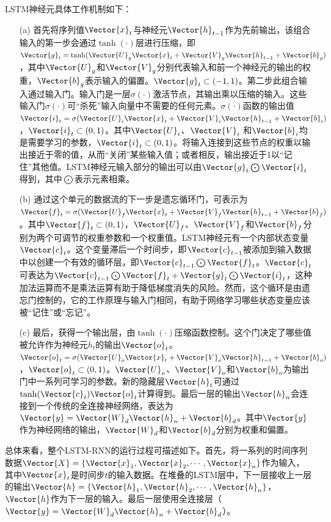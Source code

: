 LSTM神经元具体工作机制如下：
\begin{enumerate}
  \item[(a)] 首先将序列值$\Vector{x}_t$与神经元$\Vector{h}_{t-1}$作为先前输出，该组合输入的第一步会通过$\tanh(\cdot)$层进行压缩，即$\Vector{g}_t=\tanh(\Vector{U}_g \Vector{x}_t+\Vector{V}_g\Vector{h}_{t-1}+\Vector{b}_g)$，其中$\Vector{U}_g$和$\Vector{V}_g$分别代表输入和前一个神经元的输出的权重，$\Vector{b}_g$表示输入的偏置。$\Vector{g}_t\subset(-1,1)$。第二步此组合输入通过输入门。输入门是一层$\sigma(\cdot)$激活节点，其输出乘以压缩的输入。这些输入门$\sigma(\cdot)$可“杀死”输入向量中不需要的任何元素。$\sigma(\cdot)$函数的输出值$\Vector{i}_t=\sigma(\Vector{U}_i \Vector{x}_t+\Vector{V}_i\Vector{h}_{t-1}+\Vector{b}_i)$，$\Vector{i}_t\subset(0,1)$。其中$\Vector{U}_i$、$\Vector{V}_i$ 和$\Vector{b}_i$均是需要学习的参数，$\Vector{i}_t\subset(0,1)$。将输入连接到这些节点的权重以输出接近于零的值，从而“关闭”某些输入值；或者相反，输出接近于1以“记住”其他值。LSTM神经元输入部分的输出可以由$\Vector{g}_t\bigodot\Vector{i}_t$得到，其中$\bigodot$表示元素相乘。
  \item[(b)] 通过这个单元的数据流的下一步是遗忘循环门，可表示为$\Vector{f}_t=\sigma(\Vector{U}_f\Vector{x}_t+\Vector{V}_f\Vector{h}_{t-1}+\Vector{b}_f)$。其中$\Vector{f}_t\subset(0,1)$，$\Vector{U}_f$、$\Vector{V}_f$和$\Vector{b}_f$分别为两个可调节的权重参数和一个权重值。LSTM神经元有一个内部状态变量$\Vector{c}_t$。这个变量滞后一个时间步，即$\Vector{c}_{t-1}$被添加到输入数据中以创建一个有效的循环层，即$\Vector{c}_{t-1}\bigodot\Vector{f}_t$。$\Vector{c}_t$可表达为$\Vector{c}_{t-1}\bigodot\Vector{f}_t+\Vector{g}_t\bigodot\Vector{i}_t$，这种加法运算而不是乘法运算有助于降低梯度消失的风险。然而，这个循环是由遗忘门控制的，它的工作原理与输入门相同，有助于网络学习哪些状态变量应该被“记住”或“忘记”。
  \item[(c)] 最后，获得一个输出层，由$\tanh(\cdot)$压缩函数控制。这个门决定了哪些值被允许作为神经元$h_t$的输出$\Vector{o}_t$。$\Vector{o}_t=\sigma(\Vector{U}_o\Vector{x}_t+\Vector{V}_o\Vector{h}_{t-1}+\Vector{b}_o)$，$\Vector{o}_t\subset(0,1)$。$\Vector{U}_o$、$\Vector{V}_o$和$\Vector{b}_o$为输出门中一系列可学习的参数。新的隐藏层$\Vector{h}_t$可通过$\tanh(\Vector{c}_t)\Vector{o}_t$计算得到。最后一层的输出$\Vector{h}_n$会连接到一个传统的全连接神经网络，表达为$\Vector{y}=\Vector{W}_d\Vector{h}_n+\Vector{b}_d$。其中$\Vector{y}$作为神经网络的输出，$\Vector{W}_d$和$\Vector{b}_d$分别为权重和偏置。
\end{enumerate}

总体来看，整个LSTM-RNN的运行过程可描述如下。首先，将一系列的时间序列数据$\Vector{X}=\{\Vector{x}_1,\Vector{x}_2,\cdots,\Vector{x}_n\}$作为输入，其中$\Vector{x}_t$是时间步$t$的输入数据。在堆叠的LSTM层中，下一层接收上一层的输出$\Vector{h}=\{\Vector{h}_1,\Vector{h}_2,\cdots,\Vector{h}_n\}$，$\Vector{h}$作为下一层的输入。最后一层使用全连接层（$\Vector{y}=\Vector{W}_d\Vector{h}_n+\Vector{b}_d$）。

